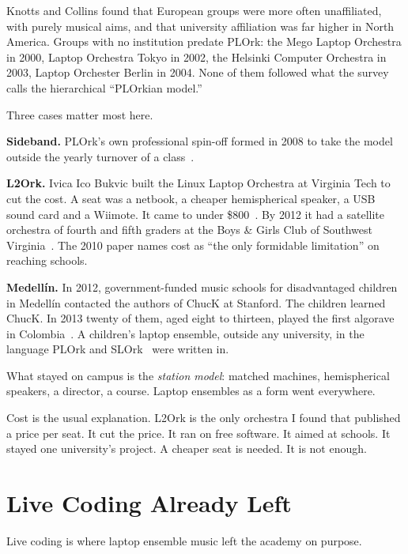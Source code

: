 \documentclass[10pt,letterpaper,twocolumn]{article}
\begin{document}
Knotts and Collins found that European groups were more often unaffiliated, with purely musical aims, and that university affiliation was far higher in North America. Groups with no institution predate PLOrk: the Mego Laptop Orchestra in 2000, Laptop Orchestra Tokyo in 2002, the Helsinki Computer Orchestra in 2003, Laptop Orchester Berlin in 2004. None of them followed what the survey calls the hierarchical ``PLOrkian model.''

Three cases matter most here.

\textbf{Sideband.} PLOrk's own professional spin-off formed in 2008 to take the model outside the yearly turnover of a class~\citep{princeton2026homecoming}.

\textbf{L2Ork.} Ivica Ico Bukvic built the Linux Laptop Orchestra at Virginia Tech to cut the cost. A seat was a netbook, a cheaper hemispherical speaker, a USB sound card and a Wiimote. It came to under \$800~\citep{bukvic2010l2ork}. By 2012 it had a satellite orchestra of fourth and fifth graders at the Boys \& Girls Club of Southwest Virginia~\citep{bukvic2012granular}. The 2010 paper names cost as ``the only formidable limitation'' on reaching schools.

\textbf{Medell\'{i}n.} In 2012, government-funded music schools for disadvantaged children in Medell\'{i}n contacted the authors of ChucK at Stanford. The children learned ChucK. In 2013 twenty of them, aged eight to thirteen, played the first algorave in Colombia~\citep{wilde2023livecoderas}. A children's laptop ensemble, outside any university, in the language PLOrk and SLOrk~\citep{wang2009slork} were written in.

What stayed on campus is the \emph{station model}: matched machines, hemispherical speakers, a director, a course. Laptop ensembles as a form went everywhere.

Cost is the usual explanation. L2Ork is the only orchestra I found that published a price per seat. It cut the price. It ran on free software. It aimed at schools. It stayed one university's project. A cheaper seat is needed. It is not enough.


\section{Live Coding Already Left}
\label{sec:livecoding}

Live coding is where laptop ensemble music left the academy on purpose.
\end{document}
